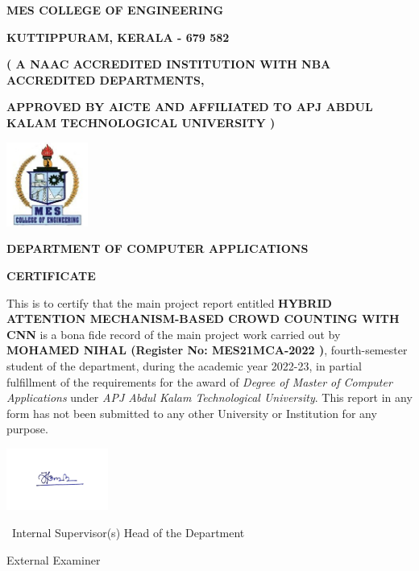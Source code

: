 \documentclass[12pt]{report}
\begin{document}
\begin{titlepage}
	\pagestyle{fancy}
	\fancyhead{} %
	\fancyfoot{} %
	
	\setlength{\headheight}{50pt} %
	\setlength{\footskip}{30pt} %
    \begin{center}
	{\large\bfseries MES COLLEGE OF ENGINEERING\par}
	{\small\bfseries KUTTIPPURAM, KERALA - 679 582\par}
	{\small\bfseries ( A NAAC ACCREDITED INSTITUTION WITH NBA ACCREDITED DEPARTMENTS,\par}
{\small\bfseries APPROVED BY AICTE AND AFFILIATED TO APJ ABDUL KALAM TECHNOLOGICAL UNIVERSITY )\par}
    \vspace{0.8cm}
    \includegraphics[width=0.2\textwidth]{MESCE.jpg}\par\vspace{0.8cm}
    \vspace{0.7cm}
    {\large\bfseries DEPARTMENT OF COMPUTER APPLICATIONS\par}
    \vspace{0.7cm}
    {\large\bfseries CERTIFICATE\par}
    \end{center}
    
    
    This is to certify that the main project report entitled  \textbf{HYBRID ATTENTION MECHANISM-BASED CROWD COUNTING WITH CNN}  is a bona fide record of the main project work carried out by \textbf{MOHAMED NIHAL (Register No: MES21MCA-2022 )}, fourth-semester student of the department, during the academic year 2022-23, in partial fulfillment of the requirements for the award of \textit{Degree of Master of Computer Applications} under \textit{APJ Abdul Kalam Technological University}. This report in any form has not been submitted to any other University or Institution for any purpose.
    
     \vspace{1cm}
	\includegraphics[width=0.25\textwidth]{sign.png}\par\
    Internal Supervisor(s)  \hspace{8.75cm} Head of the Department

\vspace{2cm}
	 \hspace{7.5cm}External Examiner    
\end{titlepage}
    
\end{document}
